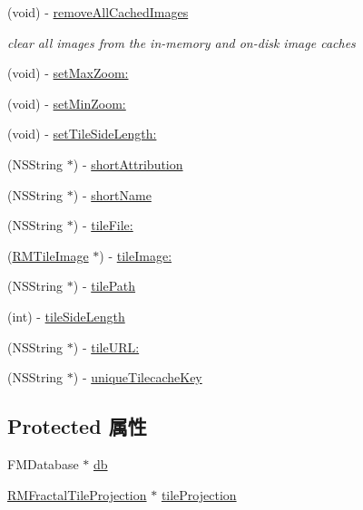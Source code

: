 \begin{DoxyCompactItemize}
\item 
(void) -\/ \hyperlink{interface_r_m_m_b_tiles_tile_source_aead47efbda8333a9fa3cf727b5843006}{remove\-All\-Cached\-Images}
\begin{DoxyCompactList}\small\item\em clear all images from the in-\/memory and on-\/disk image caches \end{DoxyCompactList}\item 
(void) -\/ \hyperlink{interface_r_m_m_b_tiles_tile_source_a031f0f9ff2eff5dc0d65baa06da2a167}{set\-Max\-Zoom\-:}
\item 
(void) -\/ \hyperlink{interface_r_m_m_b_tiles_tile_source_a9f061bba0392cbeba80d32d22b750c39}{set\-Min\-Zoom\-:}
\item 
(void) -\/ \hyperlink{interface_r_m_m_b_tiles_tile_source_a0eff5e1c822a2c039ab9cce43d337d6b}{set\-Tile\-Side\-Length\-:}
\item 
(N\-S\-String $\ast$) -\/ \hyperlink{interface_r_m_m_b_tiles_tile_source_a82fceefd32c5831a55e036b758d0e1f8}{short\-Attribution}
\item 
(N\-S\-String $\ast$) -\/ \hyperlink{interface_r_m_m_b_tiles_tile_source_ad8675324133d0b2db398d5eaf52b62a1}{short\-Name}
\item 
(N\-S\-String $\ast$) -\/ \hyperlink{interface_r_m_m_b_tiles_tile_source_a52857f152e182aa84b545c0b92e8cc92}{tile\-File\-:}
\item 
(\hyperlink{interface_r_m_tile_image}{R\-M\-Tile\-Image} $\ast$) -\/ \hyperlink{interface_r_m_m_b_tiles_tile_source_a4328f717c85aed3131d957616bb2c0de}{tile\-Image\-:}
\item 
(N\-S\-String $\ast$) -\/ \hyperlink{interface_r_m_m_b_tiles_tile_source_a74b694ffc620b97720509cbb0b3b2fdc}{tile\-Path}
\item 
(int) -\/ \hyperlink{interface_r_m_m_b_tiles_tile_source_a064b2c04e404680e4e7d5ad82fca48e8}{tile\-Side\-Length}
\item 
(N\-S\-String $\ast$) -\/ \hyperlink{interface_r_m_m_b_tiles_tile_source_aa200e9b52ab97d586d712177d31ac13f}{tile\-U\-R\-L\-:}
\item 
(N\-S\-String $\ast$) -\/ \hyperlink{interface_r_m_m_b_tiles_tile_source_ab71dd47e8661b24cb264932e78b666a6}{unique\-Tilecache\-Key}
\end{DoxyCompactItemize}
\subsection*{Protected 属性}
\begin{DoxyCompactItemize}
\item 
F\-M\-Database $\ast$ \hyperlink{interface_r_m_m_b_tiles_tile_source_ae3da662873347f8608f9d6dc3b450771}{db}
\item 
\hyperlink{interface_r_m_fractal_tile_projection}{R\-M\-Fractal\-Tile\-Projection} $\ast$ \hyperlink{interface_r_m_m_b_tiles_tile_source_a3daa7aaad56a256e9feef893221306be}{tile\-Projection}
\end{DoxyCompactItemize}


